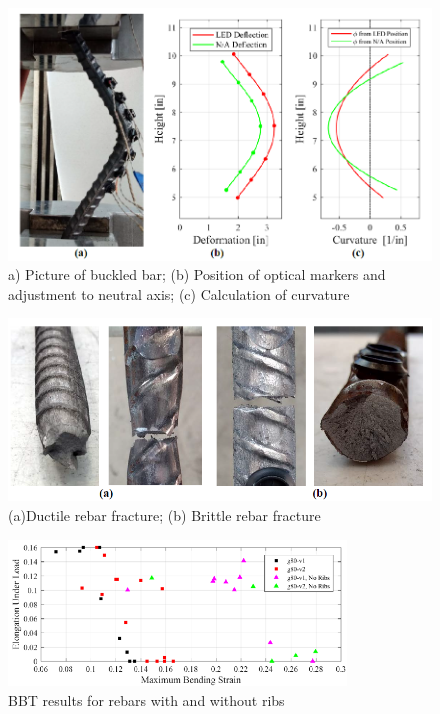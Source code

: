 \begin{figure}[htbp]
    \centering
    \includegraphics[width=1\textwidth]{Chapter-3/figs/BBT_Curvature}
    \caption{a) Picture of buckled bar; (b) Position of optical markers and adjustment to neutral axis; (c) Calculation of curvature \cite{Barcley2018}}
    \label{fig:BBT_Curvature}
\end{figure}
\begin{figure}
    \centering
    \includegraphics[width=1\textwidth]{Chapter-3/figs/BBT_Ductile_vs_Brittle}
    \caption{(a)Ductile rebar fracture; (b) Brittle rebar fracture \cite{Barcley2018}}
    \label{fig:BBT_DuctileBrittle}
\end{figure}
\begin{figure}[htbp]
    \centering
    \includegraphics[width=0.8\textwidth]{Chapter-3/figs/BBT_MaxBendignStrain}
    \caption{BBT results for rebars with and without ribs \cite{Barcley2018}}
    \label{fig:BBT_MaxBendingStrain}
\end{figure}

